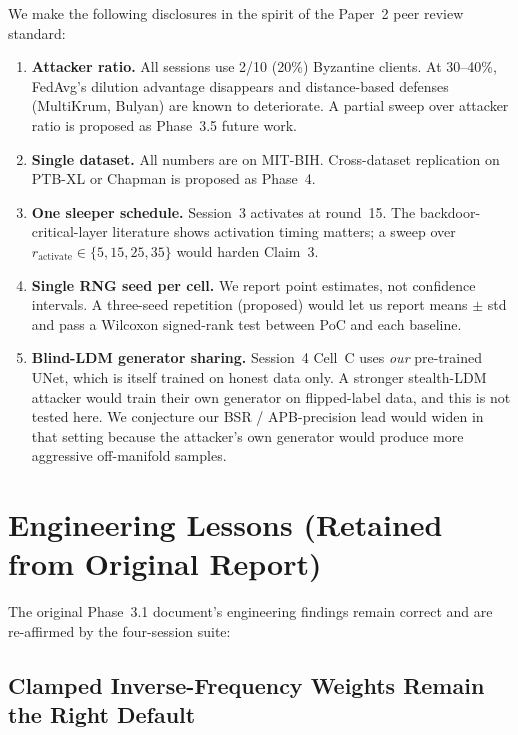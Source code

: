 \documentclass[11pt,a4paper]{article}
\begin{document}
We make the following disclosures in the spirit of the Paper~2 peer
review standard:

\begin{enumerate}[nosep]
    \item \textbf{Attacker ratio.} All sessions use 2/10 (20\%) Byzantine
          clients. At 30--40\%, FedAvg's dilution advantage disappears and
          distance-based defenses (MultiKrum, Bulyan) are known to
          deteriorate. A partial sweep over attacker ratio is proposed as
          Phase~3.5 future work.
    \item \textbf{Single dataset.} All numbers are on MIT-BIH. Cross-dataset
          replication on PTB-XL or Chapman is proposed as Phase~4.
    \item \textbf{One sleeper schedule.} Session~3 activates at round~15.
          The backdoor-critical-layer literature shows activation timing
          matters; a sweep over $r_{\text{activate}} \in \{5, 15, 25,
          35\}$ would harden Claim~3.
    \item \textbf{Single RNG seed per cell.} We report point estimates,
          not confidence intervals. A three-seed repetition (proposed) would
          let us report means $\pm$ std and pass a Wilcoxon signed-rank
          test between PoC and each baseline.
    \item \textbf{Blind-LDM generator sharing.} Session~4 Cell~C uses
          \textit{our} pre-trained UNet, which is itself trained on honest
          data only. A stronger stealth-LDM attacker would train their own
          generator on flipped-label data, and this is not tested here.
          We conjecture our BSR / APB-precision lead would widen in that
          setting because the attacker's own generator would produce
          more aggressive off-manifold samples.
\end{enumerate}

\section{Engineering Lessons (Retained from Original Report)}
\label{sec:engineering}

The original Phase~3.1 document's engineering findings remain correct
and are re-affirmed by the four-session suite:

\subsection{Clamped Inverse-Frequency Weights Remain the Right Default}
\end{document}
